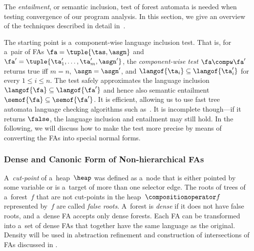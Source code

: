 The \emph{entailment}, or semantic inclusion, test of forest automata is needed when
testing convergence of our program analysis.
%
In this section, we give an overview of the techniques described in detail in~\cite{habermehl:forest,jiri:diza}. 
%

The starting point is a~component-wise language inclusion test.
That is, for a~pair of FAs ${\fa} = \tuple{\tas, \asgn}$ and ${\fa'} = \tuple{\ta_1',\ldots,\ta_m', \asgn'}$, 
the \emph{component-wise test}  $\fa\compw\fa'$ returns true iff $m=n$, $\asgn =
\asgn'$, and $\langof{\ta_i}\subseteq\langof{\ta_i'}$ for every $1 \leq i \leq
n$. The test safely approximates the language inclusion  $\langof{\fa}\subseteq\langof{\fa'}$
and hence also semantic entailment $\semof{\fa}\subseteq\semof{\fa'}$. 
It is
efficient, allowing us to use fast tree automata language checking
algorithms such as~\cite{tacas10}. It is incomplete though---if it returns
$\false$, the language inclusion and entailment may still hold.
%
In the following, we will discuss how to make the test more precise by means of converting the FAs
into special normal forms.

\subsubsection*{Dense and Canonic Form of Non-hierarchical FAs}\label{sec:dense}
A~\emph{cut-point} of a~heap~$\heap$ was defined as a~node that is either pointed by some
variable or is a~target of more than one selector edge.
The roots of trees of a~forest~$f$ that are not cut-points in the
heap~$\compositionoperator f$ represented by~$f$ are called \emph{false roots}.
%
A~forest is \emph{dense} if it does not have false roots,
and a~dense FA accepts only dense forests. 
%
Each FA can be transformed into a~set of dense FAs that
together have the same language as the original.
%
Density will be used in abstraction refinement and construction of intersections of
FAs discussed in .


